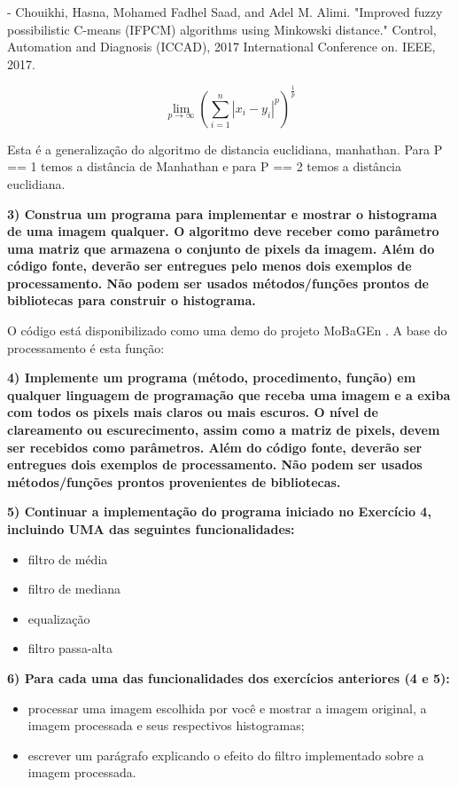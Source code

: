 \documentclass[a4paper]{sbgames}               %
\begin{document}
- Chouikhi, Hasna, Mohamed Fadhel Saad, and Adel M. Alimi. "Improved fuzzy possibilistic C-means (IFPCM) algorithms using Minkowski distance." Control, Automation and Diagnosis (ICCAD), 2017 International Conference on. IEEE, 2017.

$$ \lim_{p\to\infty}{\left(\sum_{i=1}^n |x_i-y_i|^p\right)^\frac{1}{p}} $$

Esta é a generalização do algoritmo de distancia euclidiana, manhathan. Para P == 1 temos a distância de Manhathan e para P == 2 temos a distância euclidiana.

\textbf{3) Construa um programa para implementar e mostrar o histograma de uma imagem qualquer. O algoritmo deve receber como parâmetro uma matriz que armazena o conjunto de pixels da imagem. Além do código fonte, deverão ser entregues pelo menos dois exemplos de processamento. Não podem ser usados métodos/funções prontos de bibliotecas para construir o histograma.}

O código está disponibilizado como uma demo do projeto MoBaGEn \cite{Tolstenko2018}. A base do processamento é esta função:




\textbf{4) Implemente um programa (método, procedimento, função) em qualquer
linguagem de programação que receba uma imagem e a exiba com todos
os pixels mais claros ou mais escuros. O nível de clareamento ou
escurecimento, assim como a matriz de pixels, devem ser recebidos
como parâmetros. Além do código fonte, deverão ser entregues dois
exemplos de processamento. Não podem ser usados métodos/funções
prontos provenientes de bibliotecas.}

\textbf{5) Continuar a implementação do programa iniciado no Exercício 4, incluindo UMA das seguintes funcionalidades:}

\begin{itemize}
\item filtro de média
\item filtro de mediana
\item equalização
\item filtro passa-alta
\end{itemize}

\textbf{6)  Para cada uma das funcionalidades dos exercícios anteriores (4 e 5):}
\begin{itemize}
\item processar uma imagem escolhida por você e mostrar a imagem original, a imagem processada e seus respectivos histogramas;
\item escrever um parágrafo explicando o efeito do filtro implementado sobre a
imagem processada.
\end{itemize}
\end{document}
